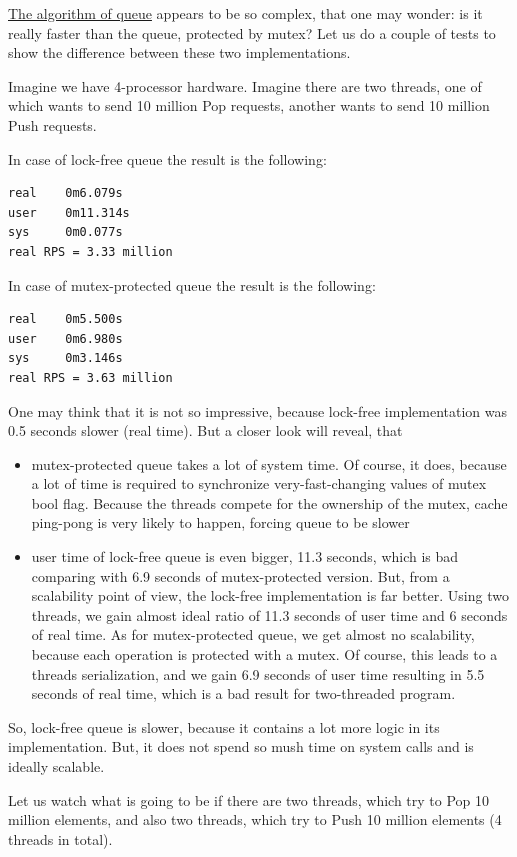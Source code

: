 \documentclass{article}
\begin{document}
\hyperref[subsec:dealloc_lock_free_queue]{The algorithm of queue} appears to be so complex, that one may wonder: is it really faster than the queue, protected by mutex? Let us do a couple of tests to show the difference between these two implementations.

Imagine we have 4-processor hardware. Imagine there are two threads, one of which wants to send 10 million Pop requests, another wants to send 10 million Push requests.

In case of lock-free queue the result is the following:
\begin{lstlisting}
real    0m6.079s
user    0m11.314s
sys     0m0.077s
real RPS = 3.33 million
\end{lstlisting}

In case of mutex-protected queue the result is the following:
\begin{lstlisting}
real    0m5.500s
user    0m6.980s
sys     0m3.146s
real RPS = 3.63 million
\end{lstlisting}

One may think that it is not so impressive, because lock-free implementation was 0.5 seconds slower (real time). But a closer look will reveal, that
\begin{itemize}
	\item mutex-protected queue takes a lot of system time. Of course, it does, because a lot of time is required to synchronize very-fast-changing values of mutex bool flag. Because the threads compete for the ownership of the mutex, cache ping-pong is very likely to happen, forcing queue to be slower
	\item user time of lock-free queue is even bigger, 11.3 seconds, which is bad comparing with 6.9 seconds of mutex-protected version. But, from a scalability point of view, the lock-free implementation is far better. Using two threads, we gain almost ideal ratio of 11.3 seconds of user time and 6 seconds of real time. As for mutex-protected queue, we get almost no scalability, because each operation is protected with a mutex. Of course, this leads to a threads serialization, and we gain 6.9 seconds of user time resulting in 5.5 seconds of real time, which is a bad result for two-threaded program.
\end{itemize}
So, lock-free queue is slower, because it contains a lot more logic in its implementation. But, it does not spend so mush time on system calls and is ideally scalable.

Let us watch what is going to be if there are two threads, which try to Pop 10 million elements, and also two threads, which try to Push 10 million elements (4 threads in total).
\end{document}
